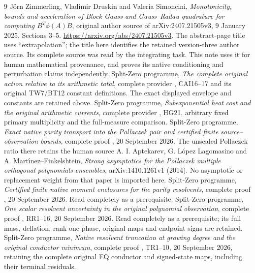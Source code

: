 \begin{thebibliography}{9}
 J\"orn Zimmerling, Vladimir Druskin and Valeria Simoncini,
\emph{Monotonicity, bounds and acceleration of Block Gauss and
Gauss--Radau quadrature for computing $B^T\phi(A)B$}, original
author source of arXiv:2407.21505v3, 9 January 2025, Sections 3--5.
\url{https://arxiv.org/abs/2407.21505v3}.
The abstract-page title uses ``extrapolation''; the title here
identifies the retained version-three author source. Its complete
source was read by the integrating task. This note uses it for
human mathematical provenance, and proves its native conditioning
and perturbation claims independently.
 Split-Zero programme, \emph{The complete original action
relative to its arithmetic total}, complete provider
, CAI16--17 and its original
TW7/BT12 constant definitions. The exact displayed envelope and
constants are retained above.
 Split-Zero programme, \emph{Subexponential heat cost and
the original arithmetic currents}, complete provider
, HG21, arbitrary
fixed primary multiplicity and the full-measure comparison.
 Split-Zero programme, \emph{Exact native parity transport
into the Pollaczek pair and certified finite source--observation
bounds}, complete proof
,
20 September 2026. The unscaled Pollaczek ratio there retains the
human source A. I. Aptekarev, G. L\'opez Lagomasino and
A. Mart\'{\i}nez--Finkelshtein, \emph{Strong asymptotics for the
Pollaczek multiple orthogonal polynomials ensembles},
arXiv:1410.1261v1 (2014). No asymptotic or replacement weight from
that paper is imported here.
 Split-Zero programme, \emph{Certified finite native moment
enclosures for the parity resolvents}, complete proof
,
20 September 2026. Read completely as a prerequisite.
 Split-Zero programme, \emph{One scalar resolvent
uncertainty in the original polynomial observation}, complete proof
, RR1--16, 20 September 2026.
Read completely as a prerequisite; its full mass, deflation,
rank-one phase, original maps and endpoint signs are retained.
 Split-Zero programme, \emph{Native resolvent truncation at
growing degree and the original conductor minimum}, complete proof
, TR1--10,
20 September 2026, retaining the complete original EQ conductor
and signed-state maps, including their terminal residuals.
\end{thebibliography}

